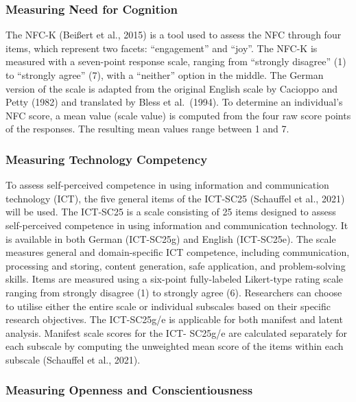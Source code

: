 \documentclass[
  12pt,
  a4paper,
  twoside]{article}
\begin{document}
\subsubsection{Measuring Need for
Cognition}\label{measuring-need-for-cognition}

The NFC-K (Beißert et al., 2015) is a tool used to assess the NFC
through four items, which represent two facets: ``engagement'' and
``joy''. The NFC-K is measured with a seven-point response scale,
ranging from ``strongly disagree'' (1) to ``strongly agree'' (7), with a
``neither'' option in the middle. The German version of the scale is
adapted from the original English scale by Cacioppo and Petty (1982) and
translated by Bless et al.~(1994). To determine an individual's NFC
score, a mean value (scale value) is computed from the four raw score
points of the responses. The resulting mean values range between 1 and
7.

\subsubsection{Measuring Technology
Competency}\label{measuring-technology-competency}

To assess self-perceived competence in using information and
communication technology (ICT), the five general items of the ICT-SC25
(Schauffel et al., 2021) will be used. The ICT-SC25 is a scale
consisting of 25 items designed to assess self-perceived competence in
using information and communication technology. It is available in both
German (ICT-SC25g) and English (ICT-SC25e). The scale measures general
and domain-specific ICT competence, including communication, processing
and storing, content generation, safe application, and problem-solving
skills. Items are measured using a six-point fully-labeled Likert-type
rating scale ranging from strongly disagree (1) to strongly agree (6).
Researchers can choose to utilise either the entire scale or individual
subscales based on their specific research objectives. The ICT-SC25g/e
is applicable for both manifest and latent analysis. Manifest scale
scores for the ICT- SC25g/e are calculated separately for each subscale
by computing the unweighted mean score of the items within each subscale
(Schauffel et al., 2021).

\subsubsection{Measuring Openness and
Conscientiousness}\label{measuring-openness-and-conscientiousness}
\end{document}
